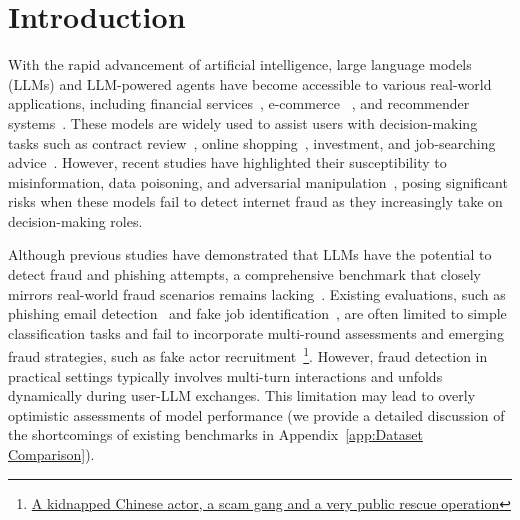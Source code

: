 \section{Introduction}



With the rapid advancement of artificial intelligence, large language models (LLMs) and LLM-powered agents have become accessible to various real-world applications, including financial services~\cite{lee2024survey, wang-brorsson-2025-large}, e-commerce ~\cite{pengecellm,palen2024investigating}, and recommender systems~\cite{kim2024large}. These models are widely used to assist users with decision-making tasks such as contract review~\cite{ma2024combining}, online shopping~\cite{jinshopping}, investment, and job-searching advice~\cite{yu2024fincon, 10.1145/3626772.3657680}. However, recent studies have highlighted their susceptibility to misinformation, data poisoning, and adversarial manipulation~\cite{DBLP:journals/corr/abs-2308-05374,DBLP:journals/corr/abs-2409-08087, siciliano2023adversarial}, posing significant risks when these models fail to detect internet fraud as they increasingly take on decision-making roles.

Although previous studies have demonstrated that LLMs have the potential to detect fraud and phishing attempts, a comprehensive benchmark that closely mirrors real-world fraud scenarios remains lacking~\cite{okosun2023evolution}. Existing evaluations, such as phishing email detection~\cite{yasin2016intelligent,uddin4785953explainable} and fake job identification~\cite{dutta2020fake}, are often limited to simple classification tasks and fail to incorporate multi-round assessments and emerging fraud strategies, such as fake actor recruitment~\footnote{\href{https://www.theguardian.com/world/2025/jan/14/wang-xing-chinese-actor-abduction-thailand-myanmar-scam-ntwnfb}{A kidnapped Chinese actor, a scam gang and a very public rescue operation}}.%
However, fraud detection in practical settings typically involves multi-turn interactions and unfolds dynamically during user-LLM exchanges. This limitation may lead to overly optimistic assessments of model performance (we provide a detailed discussion of the shortcomings of existing benchmarks in Appendix~\ref{app:Dataset Comparison}).


